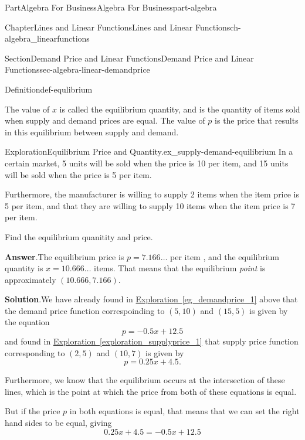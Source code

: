 \documentclass[oneside,10pt,]{tufte-book}
\newcommand{\blocktitlefont}{\relax}
\newcommand{\xreffont}{\relax}
\numberwithin{equation}{chapter}
\begin{document}
\begin{partptx}{Part}{Algebra For Business}{}{Algebra For Business}{}{}{part-algebra}
\begin{chapterptx}{Chapter}{Lines and Linear Functions}{}{Lines and Linear Functions}{}{}{ch-algebra_linearfunctions}
\begin{sectionptx}{Section}{Demand Price and Linear Functions}{}{Demand Price and Linear Functions}{}{}{sec-algebra-linear-demandprice}
\begin{definition}{Definition}{}{def-equlibrium}
\par
The value of \(x\) is called the equilibrium quantity, and is the quantity of items sold when supply and demand prices are equal. The value of \(p\) is the price that results in this equilibrium between supply and demand.%
\end{definition}
\begin{exploration}{Exploration}{Equilibrium Price and Quantity.}{ex_supply-demand-equilibrium}%
In a certain market, 5 units will be sold when the price is 10 \textdollar{} per item, and 15 units will be sold when the price is 5 \textdollar{} per item.%
\par
Furthermore, the manufacturer is willing to supply 2 items when the item price is 5 \textdollar{} per item, and that they are willing to supply 10 items when the item price is 7 \textdollar{} per item.%
\par
Find the equilibrium quanitity and price.%
\par\smallskip%
\noindent\textbf{\blocktitlefont Answer}.\hypertarget{ex_supply-demand-equilibrium-3}{}\quad{}The equilibrium price is \(p=7.166\dots\) \textdollar{} per item , and the equilibrium quantity is \(x=10.666\dots\) items.  That means that the equilibrium \emph{point} is approximately \((10.666,7.166)\).%
\par\smallskip%
\noindent\textbf{\blocktitlefont Solution}.\hypertarget{ex_supply-demand-equilibrium-4}{}\quad{}We have already found in \hyperref[eg_demandprice_1]{Exploration~{\xreffont\ref{eg_demandprice_1}}} above that the demand price function correspoinding to \((5,10)\) and \((15,5)\) is given by the equation%
\begin{equation*}
p=-0.5x + 12.5
\end{equation*}
and found in \hyperref[exploration_supplyprice_1]{Exploration~{\xreffont\ref{exploration_supplyprice_1}}} that supply price function corresponding to \((2,5)\) and \((10,7)\) is given by%
\begin{equation*}
p =  0.25x + 4.5\text{.}
\end{equation*}
%
\par
Furthermore, we know that the equilibrium occurs at the intersection of these lines, which is the point at which the price from both of these equations is equal.%
\par
But if the price \(p\) in both equations is equal, that means that we can set the right hand sides to be equal, giving%
\begin{equation*}
0.25x + 4.5 = -0.5x + 12.5
\end{equation*}

\end{exploration}
\end{sectionptx}
\end{chapterptx}
\end{partptx}
\end{document}
